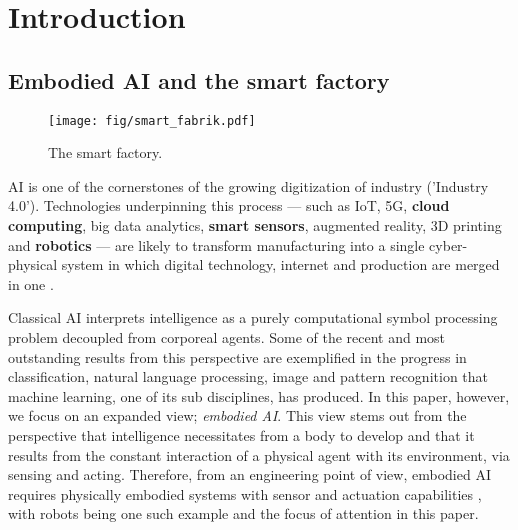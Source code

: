 \section{Introduction}
\subsection{Embodied AI and the smart factory}
\begin{figure*}[!h]
	\centering
	\texttt{[image: fig/smart\_fabrik.pdf]}
	\caption{The smart factory.}
	\label{fig:smartFactory}
\end{figure*}
\begin{fancyquotes}
	AI is one of the cornerstones of the growing digitization of industry ('Industry 4.0'). Technologies underpinning  this  process  ---  such as IoT,  5G,  \textbf{cloud  computing},  big  data  analytics,  \textbf{smart  sensors},  augmented  reality,  3D  printing  and  \textbf{robotics}  ---  are  likely  to  transform  manufacturing  into  a  single cyber-physical  system  in which digital  technology,  internet  and  production  are merged in one \cite{szczepanski_2019}.
\end{fancyquotes}
Classical AI interprets intelligence as a purely computational symbol processing problem decoupled from corporeal agents. Some of the recent and most outstanding results from this perspective are exemplified in the progress in classification, natural language processing, image and pattern recognition that machine learning, one of its sub disciplines, has produced. In this paper, however, we focus on an expanded view; \emph{embodied AI}. This view stems out from the perspective that intelligence necessitates from a body to develop and that it results from the constant interaction of a physical agent with its environment, via sensing and acting. Therefore, from an engineering point of view, embodied AI requires physically embodied systems with sensor and actuation capabilities \cite{ziemke2004embodied}, with robots being one such example and the focus of attention in this paper.

